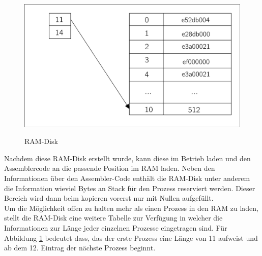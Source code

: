 \begin{figure}[H]
	\begin{center}	
	\caption{RAM-Disk}
	\includegraphics[scale=0.60]{common/ramdisk.pdf}
	\label{ramdisk}
	\end{center}
\end{figure}
\noindent
Nachdem diese RAM-Disk erstellt wurde, kann \mops diese im Betrieb laden und den Assemblercode an die passende Position im RAM laden. Neben den Informationen \"uber den Assembler-Code enth\"alt die RAM-Disk unter anderem die Information wieviel Bytes an Stack f\"ur den Prozess reserviert werden. Dieser Bereich wird dann beim kopieren vorerst nur mit Nullen aufgef\"ullt. \\
Um die M\"oglichkeit offen zu halten mehr als einen Prozess in den RAM zu laden, stellt die RAM-Disk eine weitere Tabelle zur Verf\"ugung in welcher die Informationen zur L\"ange jeder einzelnen Prozesse eingetragen sind. F\"ur Abbildung \ref{ramdisk} bedeutet dass, das der erste Prozess eine L\"ange von 11 aufweist und ab dem 12. Eintrag der n\"achste Prozess beginnt.
